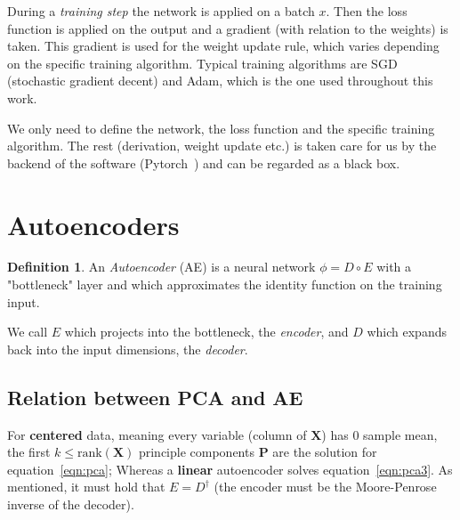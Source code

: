\documentclass[11pt, a4paper]{report}
\theoremstyle{plain}
\theoremstyle{definition}
\newtheorem{mydef}{Definition}[chapter]
\theoremstyle{remark}
\newcommand{\bv}[1]{\boldsymbol{#1}}
\begin{document}
During a \emph{training step} the network is applied on a batch $x$. Then the
loss function is applied on the output and a gradient (with relation to the
weights) is taken. This gradient is used for the weight update rule, which
varies depending on the specific training algorithm. Typical training algorithms
are SGD (stochastic gradient decent) and Adam, which is the one used throughout
this work.

We only need to define the network, the loss function and the specific training
algorithm. The rest (derivation, weight update etc.) is taken care for us by the
backend of the software (Pytorch~\cite{pytorch2018pytorch}) and can be regarded
as a black box.



\section{Autoencoders}
\begin{mydef}
\label{def:autoencoder}
An \textit{Autoencoder} (AE) is a neural network $\phi = D \circ E$ with a "bottleneck" layer 
and which
approximates the identity function on the training input.

We call $E$ which projects into the bottleneck, the \emph{encoder}, and $D$
which expands back into the input dimensions, the \emph{decoder}.
\end{mydef}



\subsection{Relation between PCA and AE}
For \textbf{centered} data, meaning every variable (column of $\bv{X}$)
has $0$ sample mean, the first $k \leq \text{rank}(\bv{X})$ principle components
$\bv{P}$ are the solution for equation~\ref{eqn:pca}; Whereas a \textbf{linear}
autoencoder solves equation~\ref{eqn:pca3}. As mentioned, it must hold that $E =
D^{\dagger}$ (the encoder must be the Moore-Penrose inverse of the decoder).
\end{document}
